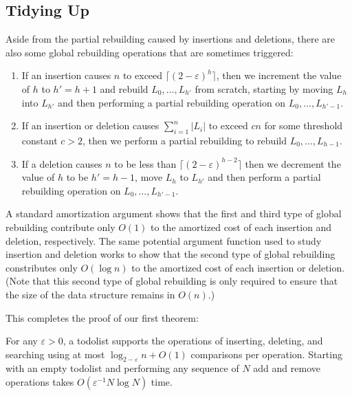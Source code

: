 \documentclass[lotsofwhite]{patmorin}
\newcommand{\eps}{\varepsilon}
\begin{document}
\subsection{Tidying Up}

Aside from the partial rebuilding caused by insertions and deletions, there are also some global rebuilding operations that are sometimes triggered:
\begin{enumerate}
\item If an insertion causes $n$ to exceed $\lceil(2-\eps)^h\rceil$, then
we increment the value of $h$ to $h'=h+1$ and rebuild $L_0,\ldots,L_{h'}$
from scratch, starting by moving $L_h$ into $L_{h'}$ and then performing
a partial rebuilding operation on $L_{0},\ldots,L_{h'-1}$.
\item If an insertion or deletion causes $\sum_{i=1}^n |L_i|$ to exceed $cn$ for some threshold constant $c>2$, then we perform a partial rebuilding to rebuild $L_{0},\ldots,L_{h-1}$.
\item If a deletion causes $n$ to be less than $\lceil(2-\eps)^{h-2}\rceil$ then we decrement the value of $h$ to be $h'=h-1$, move $L_h$ to $L_{h'}$ and then perform a partial rebuilding operation on $L_{0},\ldots,L_{h'-1}$. 
\end{enumerate}

A standard amortization argument shows that the first and third type
of global rebuilding contribute only $O(1)$ to the amortized cost of
each insertion and deletion, respectively.  The same potential argument
function used to study insertion and deletion works to show that the
second type of global rebuilding constributes only $O(\log n)$ to the
amortized cost of each insertion or deletion.  (Note that this second
type of global rebuilding is only required to ensure that the size of
the data structure remains in $O(n)$.)

This completes the proof of our first theorem:

\begin{thm}
For any $\eps >0$, a todolist supports the operations of inserting,
deleting, and searching using at most $\log_{2-\eps} n + O(1)$ comparisons
per operation.  Starting with an empty todolist and performing any
sequence of $N$ add and remove operations takes $O(\eps^{-1}N\log
N)$ time.
\end{thm}
\end{document}
